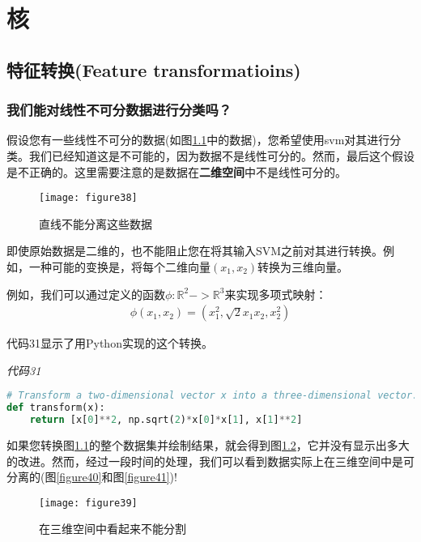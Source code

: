\chapter{核}

\section{特征转换(Feature transformatioins)}

\subsection{我们能对线性不可分数据进行分类吗？}

假设您有一些线性不可分的数据(如图\ref{figure38}中的数据)，您希望使用svm对其进行分类。我们已经知道这是不可能的，因为数据不是线性可分的。然而，最后这个假设是不正确的。这里需要注意的是数据在\textbf{二维空间}中不是线性可分的。

\begin{figure}[ht]
	\centering
	\texttt{[image: figure38]}
	\caption{直线不能分离这些数据}
	\label{figure38}
\end{figure}


即使原始数据是二维的，也不能阻止您在将其输入SVM之前对其进行转换。例如，一种可能的变换是，将每个二维向量$(x_1,x_2)$转换为三维向量。

例如，我们可以通过定义的函数$\phi :\mathbb{R}^2->\mathbb{R}^3$来实现多项式映射：
\begin{gather*}
\phi (x_1,x_2) = (x_1^2,\sqrt{2}x_1 x_2,x_2^2)
\end{gather*}

代码31显示了用Python实现的这个转换。

\emph{代码31}

\begin{lstlisting}[language=python]
# Transform a two-dimensional vector x into a three-dimensional vector. 
def transform(x): 
    return [x[0]**2, np.sqrt(2)*x[0]*x[1], x[1]**2]
\end{lstlisting}

如果您转换图\ref{figure38}的整个数据集并绘制结果，就会得到图\ref{figure39}，它并没有显示出多大的改进。然而，经过一段时间的处理，我们可以看到数据实际上在三维空间中是可分离的(图\ref{figure40}和图\ref{figure41})!

\begin{figure}[ht]
	\centering
	\texttt{[image: figure39]}
	\caption{在三维空间中看起来不能分割}
	\label{figure39}
\end{figure}

